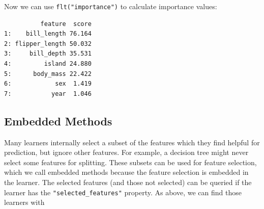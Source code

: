 \begin{Shaded}
\begin{Highlighting}[]
\OtherTok{=} \NormalTok{(}\NormalTok{)}
\SpecialCharTok{$}\SpecialCharTok{$}\NormalTok{row\_ids[}\SpecialCharTok{$}\NormalTok{())])}
\end{Highlighting}
\end{Shaded}

Now we can use \texttt{flt("importance")} to calculate importance
values:

\begin{Shaded}
\begin{Highlighting}[]
\OtherTok{=} \NormalTok{(}\NormalTok{, }
\SpecialCharTok{$}
\end{Highlighting}
\end{Shaded}

\begin{verbatim}
          feature  score
1:    bill_length 76.164
2: flipper_length 50.032
3:     bill_depth 35.531
4:         island 24.880
5:      body_mass 22.422
6:            sex  1.419
7:           year  1.046
\end{verbatim}

\hypertarget{sec-fs-embedded-methods}{%
\subsection{Embedded Methods}\label{sec-fs-embedded-methods}}

Many learners internally select a subset of the features which they find
helpful for prediction, but ignore other features. For example, a
decision tree might never select some features for splitting. These
subsets can be used for feature selection, which we call embedded
methods because the feature selection is
embedded in the learner. The selected features (and those not selected)
can be queried if the learner has the \texttt{"selected\_features"}
property. As above, we can find those learners with

\begin{Shaded}
\begin{Highlighting}[]
\NormalTok{(mlr\_learners)[}
   \NormalTok{ x)]}
\end{Highlighting}
\end{Shaded}

